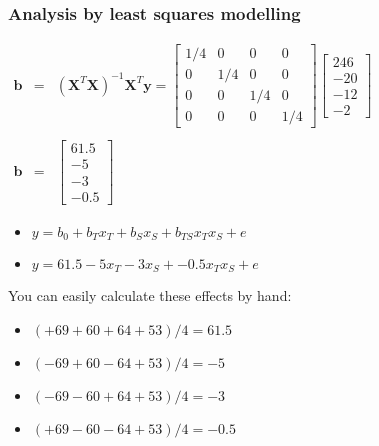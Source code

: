 \begin{frame}\frametitle{Analysis by least squares modelling}

	$
	\begin{array}{rcl}
		\mathbf{b} &=& (\mathbf{X}^T\mathbf{X})^{-1}\mathbf{X}^T\mathbf{y} =
		\begin{bmatrix}
			1/4 & 0 & 0 & 0\\
			0 & 1/4 & 0 & 0\\
			0 & 0 & 1/4 & 0\\
			0 & 0 & 0 & 1/4
		\end{bmatrix}
		\begin{bmatrix}
			246 \\
			-20 \\
			-12 \\
			-2
		\end{bmatrix}
		\\
		\\
		\mathbf{b} &=&
		\begin{bmatrix}
			61.5 \\
			-5 \\
			-3 \\
			-0.5
		\end{bmatrix}
	\end{array}
	$
	\begin{itemize}
		\item	$y = b_0 + b_Tx_T + b_S x_S + b_{TS} x_Tx_S + e$
		\item	$y = 61.5 - 5 x_T - 3 x_S + - 0.5 x_Tx_S + e$
	\end{itemize}

	You can easily calculate these effects by hand:
	\begin{itemize}
		\item	$(+ 69 + 60 + 64 + 53)/4 = 61.5$
		\item	$(- 69 + 60 - 64 + 53)/4 = -5$
		\item	$(- 69 - 60 + 64 + 53)/4 = -3$
		\item	$(+ 69 - 60 - 64 + 53)/4 = -0.5$
	\end{itemize}
\end{frame}

